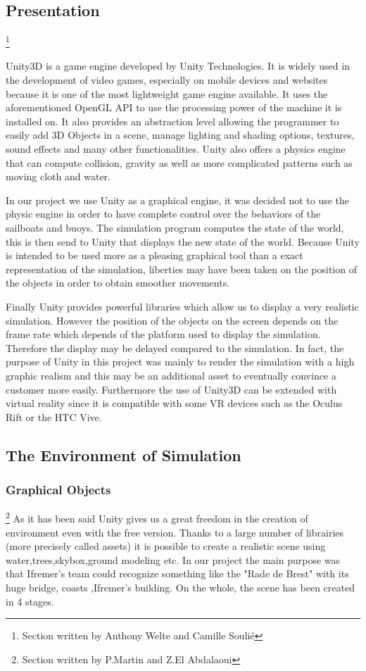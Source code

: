 \documentclass[a4paper]{report}
\begin{document}
\subsection{Presentation}
\footnote{Section written by Anthony Welte and Camille Soulié}

Unity3D is a game engine developed by Unity Technologies. It is widely used in the development of video games, especially on mobile devices and websites because it is one of the most lightweight game engine available. It uses the aforementioned OpenGL API to use the processing power of the machine it is installed on. It also provides an abstraction level allowing the programmer to easily add 3D Objects in a scene, manage lighting and shading options, textures, sound effects and many other functionalities. Unity also offers a physics engine that can compute collision, gravity as well as more complicated patterns such as moving cloth and water. 

In our project we use Unity as a graphical engine, it was decided not to use the physic engine in order to have complete control over the behaviors of the sailboats and buoys. The simulation program computes the state of the world, this is then send to Unity that displays the new state of the world. Because Unity is intended to be used more as a pleasing graphical tool than a exact representation of the simulation, liberties may have been taken on the position of the objects in order to obtain smoother movements.

Finally Unity provides powerful libraries which allow us to display a very realistic simulation. However the position of the objects on the screen depends on the frame rate which depends of the platform used to display the simulation. Therefore the display may be delayed compared to the simulation. In fact, the purpose of Unity in this project was mainly to render the simulation with a high graphic realism and this may be an additional asset to eventually convince a customer more easily. Furthermore the use of Unity3D can be extended with virtual reality since it is compatible with some VR devices such as the Oculus Rift or the HTC Vive. 

\subsection{The Environment of Simulation}
\subsubsection{Graphical Objects}
\footnote{Section written by P.Martin and Z.El Abdalaoui}
As it has been said Unity gives us a great freedom in the creation of environment even with the free version. Thanks to a large number of librairies (more precisely called assets) it is possible to create a realistic scene using water,trees,skybox,ground modeling etc.
In our project the main purpose was that Ifremer's team could recognize something like the "Rade de Brest" with its huge bridge, coasts ,Ifremer's building. On the whole, the scene has been created in 4 stages.
\end{document}
